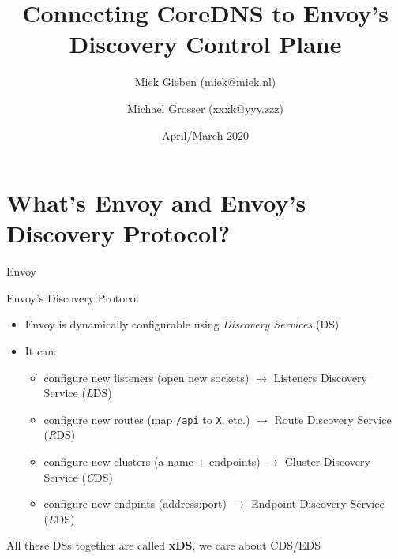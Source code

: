 \documentclass[aspectratio=169]{beamer}
\title{Connecting CoreDNS to Envoy's Discovery Control Plane}
\date{April/March 2020}
\author{Miek Gieben (miek@miek.nl) \and Michael Grosser (xxxk@yyy.zzz)}
\institute{Centre for protobuf Nerding}
\begin{document}
    \let\oldfootnotesize\footnotesize
    \renewcommand*{\footnotesize}{\oldfootnotesize\tiny}

    \maketitle

    \section{What's Envoy and Envoy's Discovery Protocol?}
    \begin{frame}{Envoy}

    \end{frame}

    \begin{frame}{Envoy's Discovery Protocol}
        \begin{itemize}
            \item Envoy is dynamically configurable using \emph{Discovery Services} (DS)
            \item It can:
            \begin{itemize}
                \item configure new listeners (open new sockets) $\rightarrow$ Listeners Discovery Service (\emph{L}DS)
                \item configure new routes (map \texttt{/api} to \texttt{X}, etc.) $\rightarrow$ Route Discovery Service (\emph{R}DS)
                \item configure new clusters (a name + endpoints) $\rightarrow$ Cluster Discovery Service (\emph{C}DS)
                \item configure new endpints (address:port) $\rightarrow$ Endpoint Discovery Service (\emph{E}DS)
            \end{itemize}
        \end{itemize}

        All these DSs together are called {\bf xDS}, we care about CDS/EDS
    \end{frame}

\end{document}
